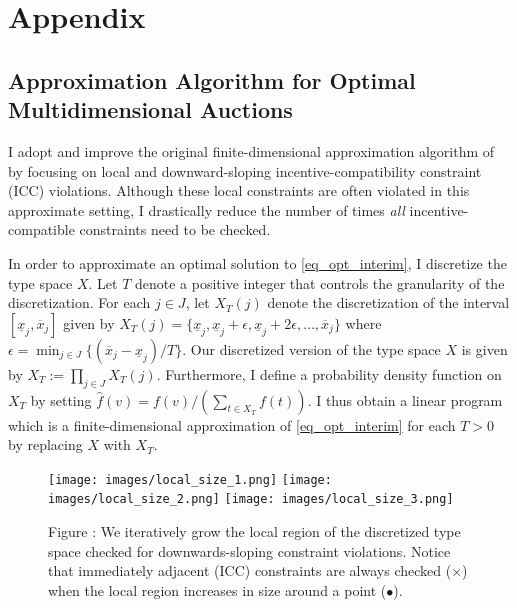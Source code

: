 \chapter{Appendix}\label{ch_appendix}

\section{Approximation Algorithm for Optimal Multidimensional Auctions}\label{appendix:algo}

I adopt and improve the original finite-dimensional approximation algorithm of \autocite{belloni2010multidimensional} by focusing on local and downward-sloping incentive-compatibility constraint (ICC) violations. Although these local constraints are often violated in this approximate setting, I drastically reduce the number of times \textit{all} incentive-compatible constraints need to be checked.

In order to approximate an optimal solution to \ref{eq_opt_interim}, I discretize the type space $X$. Let $T$ denote a positive integer that controls the granularity of the discretization. For each $j \in J$, let $X_T(j)$ denote the discretization of the interval $[\underline{x}_j,\overline{x}_j]$ given by $X_T(j) = \{\underline{x}_j, \underline{x}_j + \epsilon, \underline{x}_j + 2\epsilon, \dots, \overline{x}_j\}$ where $\epsilon = \min_{j \in J} \{(\overline{x}_j - \underline{x}_j) / T\}$. Our discretized version of the type space $X$ is given by $X_T := \prod_{j \in J} X_T(j)$. Furthermore, I define a probability density function on $X_T$ by setting $\hat{f}(v) = f(v) / (\sum_{t \in X_T} f(t))$. I thus obtain a linear program which is a finite-dimensional approximation of \ref{eq_opt_interim} for each $T > 0$ by replacing $X$ with $X_T$.

\begin{figure}[t]
    \begin{center}
    \texttt{[image: images/local\_size\_1.png]}
    \texttt{[image: images/local\_size\_2.png]}
    \texttt{[image: images/local\_size\_3.png]}
    \end{center}
    
    \vspace{1mm}
    \raggedright{\small {\sc Figure \thefig\label{fig:sim1}:} We iteratively grow the local region of the discretized type space checked for downwards-sloping constraint violations. Notice that immediately adjacent (ICC) constraints are always checked ($\times$) when the local region increases in size around a point ($\bullet$).}
\end{figure}


